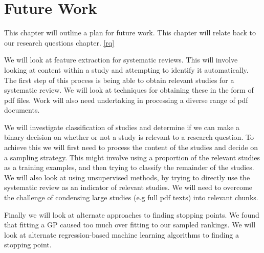 \chapter{Future Work} \label{fw}

This chapter will outline a plan for future work. This chapter will relate back to our research questions chapter. \ref{rq}

We will look at feature extraction for systematic reviews. This will involve looking at content within a study and attempting to identify it automatically. The first step of this process is being able to obtain relevant studies for a systematic review. We will look at techniques for obtaining these in the form of pdf files. Work will also need undertaking in processing a diverse range of pdf documents.

We will investigate classification of studies and determine if we can make a binary decision on whether or not a study is relevant to a research question. To achieve this we will first need to process the content of the studies and decide on a sampling strategy. This might involve using a proportion of the relevant studies as a training examples, and then trying to classify the remainder of the studies. We will also look at using unsupervised methods, by trying to directly use the systematic review as an indicator of relevant studies. We will need to overcome the challenge of condensing large studies (e.g full pdf texts) into relevant chunks.

Finally we will look at alternate approaches to finding stopping points. We found that fitting a GP caused too much over fitting to our sampled rankings. We will look at alternate regression-based machine learning algorithms to finding a stopping point.




